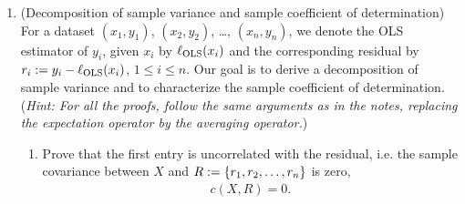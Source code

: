 \documentclass[12pt,twoside]{article}
\begin{document}
\begin{enumerate}
\item(Decomposition of sample variance and sample coefficient of determination) 
For a dataset $(x_1,y_1)$, $(x_2,y_2)$, \ldots, $(x_n,y_n)$, we denote the OLS estimator of $y_i$, given $x_i$ by $\ell_{\operatorname{OLS}} (x_i)$ and the corresponding residual by $r_i := y_i -  \ell_{\operatorname{OLS}} (x_i)$, $1\leq i \leq n$. Our goal is to derive a decomposition of sample variance and to characterize the sample coefficient of determination. 
(\emph{Hint: For all the proofs, follow the same arguments as in the notes, replacing the expectation operator by the averaging operator.})
\begin{enumerate}
\item Prove that the first entry is uncorrelated with the residual, i.e. the sample covariance between $X$ and  $R:=\left\{ r_1,r_2,\ldots,r_n \right\}$ is zero,
\begin{align}
c(X,R) = 0. 
\end{align}
\begin{itemize}



\end{itemize}
\end{enumerate}
\end{enumerate}
\end{document}
